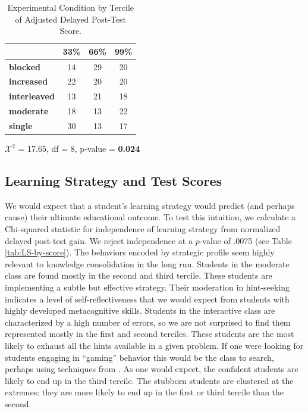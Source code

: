 \documentclass{edm_template}
\begin{document}
\begin{table}[hbtp]

\centering
\begin{tabular}{|l || c | c | c |}
\hline
&33\%&66\%&99\%\\ \hline \hline
  \textbf{blocked}  &   14& 29& 20 \\ \hline
  \textbf{increased}&   22& 20& 20 \\ \hline
\textbf{interleaved}& 13& 21& 18 \\ \hline
  \textbf{moderate} &   18& 13& 22 \\ \hline
    \textbf{single} &      30& 13& 17 \\ \hline
 \end{tabular}
  \begin{center} $\mathcal{X}^2$ = 17.65, df = 8, p-value = {\bf 0.024} \end{center}
 \caption{Experimental Condition by Tercile of Adjusted Delayed Post-Test Score.}
\label{tab:exp-and-score}
\end{table}


\subsection{Learning Strategy and Test Scores}

We would expect that a student's learning strategy would predict (and perhaps cause) their ultimate educational outcome. To test this intuition, we calculate a Chi-squared statistic for independence of learning strategy from normalized delayed post-test gain. We reject independence at a $p$-value of .0075 (see Table \ref{tab:LS-by-score}). The behaviors encoded by strategic profile seem highly relevant to knowledge consolidation in the long run. Students in the moderate class are found mostly in the second and third tercile. These students are implementing a subtle but effective strategy. Their moderation in hint-seeking indicates a level of self-reflectiveness that we would expect from students with highly developed metacognitive skills. Students in the interactive class are characterized by a high number of errors, so we are not surprised to find them represented mostly in the first and second terciles. These students are the most likely to exhaust all the hints available in a given problem. If one were looking for students engaging in ``gaming'' behavior this would be the class to search, perhaps using techniques from \cite{Baker2009b}. As one would expect, the confident  students are likely to end up in the third tercile. The stubborn students are clustered at the extremes: they are more likely to end up in the first or third tercile than the second. 
\end{document}
